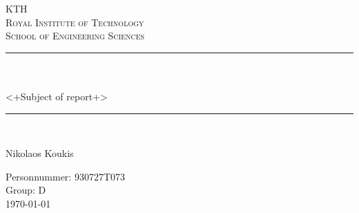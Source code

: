 \newcommand{\horrule}[1]{\rule{\linewidth}{#1}} %

\begin{titlepage}


\begin{center}
\normalfont \normalsize 
\textsc{KTH} \\  %
\textsc{Royal Institute of Technology} \\  %
\textsc{School of Engineering Sciences} \\ [25pt] %
\horrule{0.5pt} \\[0.4cm] %
 \vspace{5mm}\\
<+Subject of report+>\\ %
\horrule{2pt} \\[0.5cm] %
\vspace*{10mm}

\LARGE 
Nikolaos Koukis

\vfill
\normalsize \normalfont
Personnummer: 930727T073\\
Group: D\\
\today
\end{center}
\end{titlepage}
